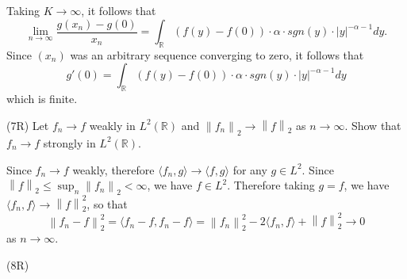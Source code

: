 \documentclass[answers]{exam}
\theoremstyle{problemstyle}
\newcommand{\norm}[1]{\left\lVert#1\right\rVert} %
\newcommand{\1}[1]{\textbf{1}_{\left[#1\right]}} %
\def\limn{\lim_{n\to\infty}} %
\def\R{\mathbb{R}} %
\begin{document}
\begin{questions}
\begin{parts}
\begin{solution}
Taking $K\to \infty$, it follows that
\begin{equation*}
\limn \frac{g(x_n)-g(0)}{x_n} = \int_{\R} (f(y)-f(0))\cdot \alpha\cdot sgn(y)\cdot |y|^{-\alpha-1}dy.
\end{equation*}
Since $(x_n)$ was an arbitrary sequence converging to zero, it follows that $$g'(0) = \int_{\R} (f(y)-f(0))\cdot \alpha\cdot sgn(y)\cdot |y|^{-\alpha-1}dy$$
which is finite.
\end{solution}
\end{parts}


\question (7R) Let $f_n \to f$ weakly in $L^2(\R)$ and $\norm{f_n}_2 \to \norm{f}_2$ as $n\to\infty$. Show that $f_n\to f$ strongly in $L^2(\R)$.

\begin{solution}
Since $f_n\to f$ weakly, therefore $\langle f_n, g \rangle \to \langle f, g \rangle$ for any $g\in L^2$. Since $\norm{f}_2 \leq \sup_{n}\norm{f_n}_2 <\infty$, we have $f\in L^2$. Therefore taking $g=f$, we have $\langle f_n,f\rangle \to \norm{f}_2^2$, so that
\begin{equation*}
\norm{f_n-f}_2^2 = \langle f_n-f,f_n-f\rangle = \norm{f_n}_2^2 -2 \langle f_n,f\rangle + \norm{f}^2_2 \to 0
\end{equation*}
as $n\to \infty$.
\end{solution}
\question (8R) 
\end{questions}
\end{document}
